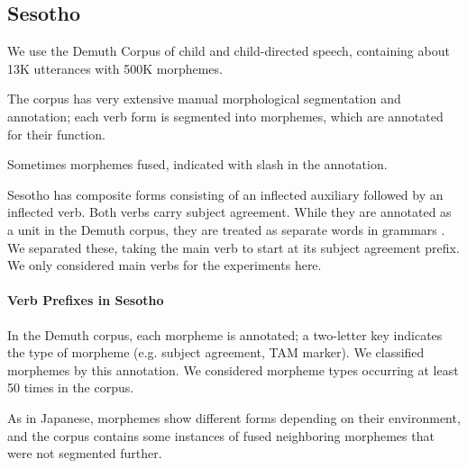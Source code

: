 




\subsection{Sesotho}

\cite{doke1967textbook}

We use the Demuth Corpus \cite{demuth1992acquisition} of child and child-directed speech, containing about 13K utterances with 500K morphemes.

The corpus has very extensive manual morphological segmentation and annotation; each verb form is segmented into morphemes, which are annotated for their function.

Sometimes morphemes fused, indicated with slash in the annotation.

Sesotho has composite forms consisting of an inflected auxiliary followed by an inflected verb.
Both verbs carry subject agreement.
While they are annotated as a unit in the Demuth corpus, they are treated as separate words in grammars \citep{doke1967textbook,guma1971outline,lombard1969handbook}.
We separated these, taking the main verb to start at its subject agreement prefix.
We only considered main verbs for the experiments here.


\paragraph{Verb Prefixes in Sesotho}

In the Demuth corpus, each morpheme is annotated; a two-letter key indicates the type of morpheme (e.g. subject agreement, TAM marker).
We classified morphemes by this annotation.
We considered morpheme types occurring at least 50 times in the corpus.

As in Japanese, morphemes show different forms depending on their environment, and the corpus contains some instances of fused neighboring morphemes that were not segmented further.

